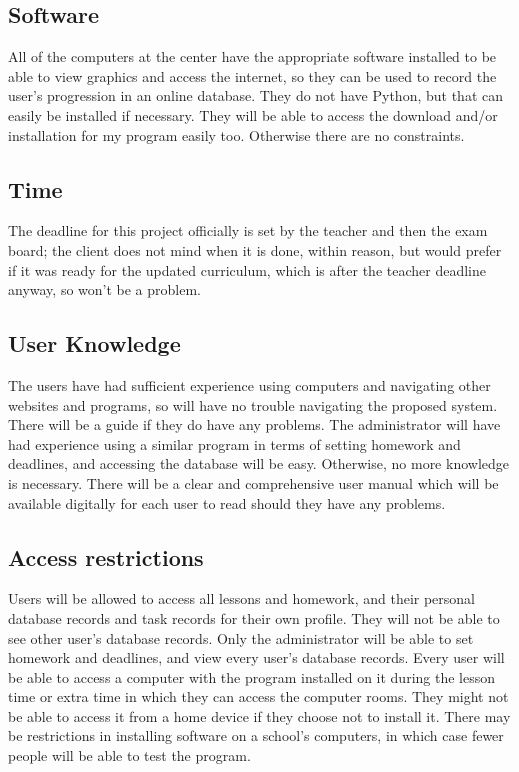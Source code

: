 \subsection{Software}

All of the computers at the center have the appropriate software installed to be able to view graphics and access the internet, so they can be used to record the user's progression in an online database. They do not have Python, but that can easily be installed if necessary. They will be able to access the download and/or installation for my program easily too. Otherwise there are no constraints.

\subsection{Time}

The deadline for this project officially is set by the teacher and then the exam board; the client does not mind when it is done, within reason, but would prefer if it was ready for the updated curriculum, which is after the teacher deadline anyway, so won't be a problem.

\subsection{User Knowledge}

The users have had sufficient experience using computers and navigating other websites and programs, so will have no trouble navigating the proposed system. There will be a guide if they do have any problems. The administrator will have had experience using a similar program in terms of setting homework and deadlines, and accessing the database will be easy. Otherwise, no more knowledge is necessary. There will be a clear and comprehensive user manual which will be available digitally for each user to read should they have any problems.

\subsection{Access restrictions}

Users will be allowed to access all lessons and homework, and their personal database records and task records for their own profile. They will not be able to see other user's database records. Only the administrator will be able to set homework and deadlines, and view every user's database records. Every user will be able to access a computer with the program installed on it during the lesson time or extra time in which they can access the computer rooms. They might not be able to access it from a home device if they choose not to install it. There may be restrictions in installing software on a school's computers, in which case fewer people will be able to test the program.

